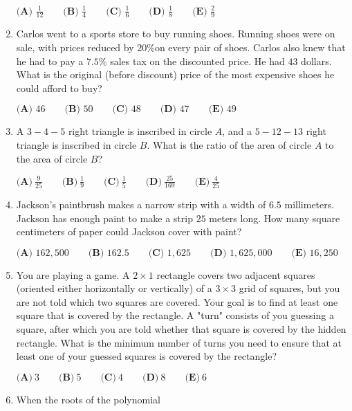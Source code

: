 \documentclass{article}
\begin{document}
\begin{enumerate}[label=\arabic*., itemsep=0.5em]
\(\textbf{(A) }\frac{1}{12}\qquad\textbf{(B) }\frac{1}{4}\qquad\textbf{(C) }\frac{1}{6}\qquad\textbf{(D) }\frac{1}{8}\qquad\textbf{(E) }\frac{2}{9}\)\par \vspace{0.5em}\item Carlos went to a sports store to buy running shoes. Running shoes were on sale, with prices reduced by \(20\%\)on every pair of shoes. Carlos also knew that he had to pay a \(7.5\%\) sales tax on the discounted price. He had \(43\) dollars. What is the original (before discount) price of the most expensive shoes he could afford to buy?

\(\textbf{(A) }46\qquad\textbf{(B) }50\qquad\textbf{(C) }48\qquad\textbf{(D) }47\qquad\textbf{(E) }49\)\par \vspace{0.5em}\item A \(3-4-5\) right triangle is inscribed in circle \(A\), and a \(5-12-13\) right triangle is inscribed in circle \(B\). What is the ratio of the area of circle \(A\) to the area of circle \(B\)?

\(\textbf{(A)}~\frac{9}{25}\qquad\textbf{(B)}~\frac{1}{9}\qquad\textbf{(C)}~\frac{1}{5}\qquad\textbf{(D)}~\frac{25}{169}\qquad\textbf{(E)}~\frac{4}{25}\)\par \vspace{0.5em}\item Jackson's paintbrush makes a narrow strip with a width of \(6.5\) millimeters. Jackson has enough paint to make a strip \(25\) meters long. How many square centimeters of paper could Jackson cover with paint?

\(\textbf{(A) }162,500\qquad\textbf{(B) }162.5\qquad\textbf{(C) }1,625\qquad\textbf{(D) }1,625,000\qquad\textbf{(E) }16,250\)\par \vspace{0.5em}\item You are playing a game. A \(2 \times 1\) rectangle covers two adjacent squares (oriented either horizontally or vertically) of a \(3 \times 3\) grid of squares, but you are not told which two squares are covered. Your goal is to find at least one square that is covered by the rectangle. A "turn" consists of you guessing a square, after which you are told whether that square is covered by the hidden rectangle. What is the minimum number of turns you need to ensure that at least one of your guessed squares is covered by the rectangle?

\(\textbf{(A)}~3\qquad\textbf{(B)}~5\qquad\textbf{(C)}~4\qquad\textbf{(D)}~8\qquad\textbf{(E)}~6\)\par \vspace{0.5em}\item When the roots of the polynomial



\end{enumerate}
\end{document}
